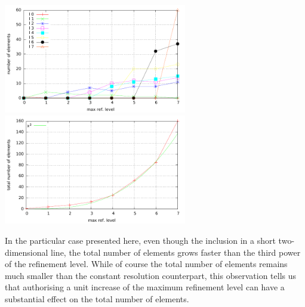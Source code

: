 \includegraphics[width=8cm]{images/meshes/AMR/amr_data1.pdf}
\includegraphics[width=8cm]{images/meshes/AMR/amr_data2.pdf}

In the particular case presented here, even though the inclusion in a short 
two-dimensional line, the total number of elements grows faster than the 
third power of the refinement level. While of course the total number 
of elements remains much smaller than the constant resolution counterpart, 
this observation tells us that authorising a unit increase of the maximum 
refinement level can have a substantial effect on the total number of elements.

\newpage

